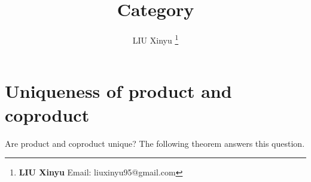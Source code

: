 \documentclass[UTF8]{article}
\begin{document}
\title{Category}

\author{LIU Xinyu
\thanks{{\bfseries LIU Xinyu} \newline
  Email: liuxinyu95@gmail.com \newline}
  }

\maketitle
\fi


\chapter*{Uniqueness of product and coproduct}

Are product and coproduct unique? The following theorem answers this question.
\end{document}
